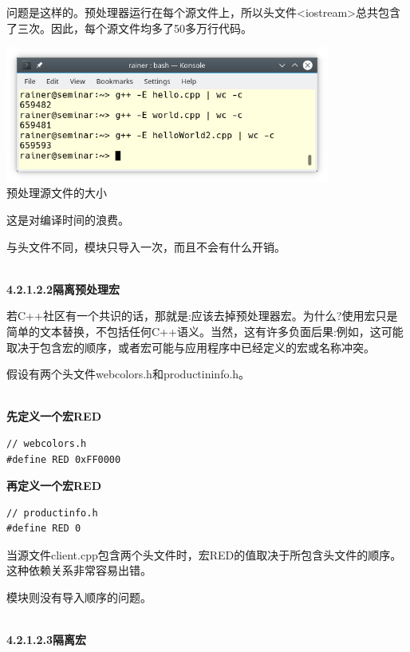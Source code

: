 问题是这样的。预处理器运行在每个源文件上，所以头文件<iostream>总共包含了三次。因此，每个源文件均多了50多万行代码。

\begin{center}
\includegraphics[width=0.8\textwidth]{content/3/chapter4/images/15.png}\\
预处理源文件的大小
\end{center}

这是对编译时间的浪费。

与头文件不同，模块只导入一次，而且不会有什么开销。

\hspace*{\fill} \\ %
\noindent
\textbf{4.2.1.2.2\hspace{0.2cm}隔离预处理宏}

若C++社区有一个共识的话，那就是:应该去掉预处理器宏。为什么?使用宏只是简单的文本替换，不包括任何C++语义。当然，这有许多负面后果:例如，这可能取决于包含宏的顺序，或者宏可能与应用程序中已经定义的宏或名称冲突。

假设有两个头文件webcolors.h和productininfo.h。

\hspace*{\fill} \\ %
\noindent
\textbf{先定义一个宏RED}
\begin{lstlisting}[style=styleCXX]
// webcolors.h
#define RED 0xFF0000
\end{lstlisting}

\noindent
\textbf{再定义一个宏RED}
\begin{lstlisting}[style=styleCXX]
// productinfo.h
#define RED 0
\end{lstlisting}

当源文件client.cpp包含两个头文件时，宏RED的值取决于所包含头文件的顺序。这种依赖关系非常容易出错。

模块则没有导入顺序的问题。

\hspace*{\fill} \\ %
\noindent
\textbf{4.2.1.2.3\hspace{0.2cm}隔离宏}

